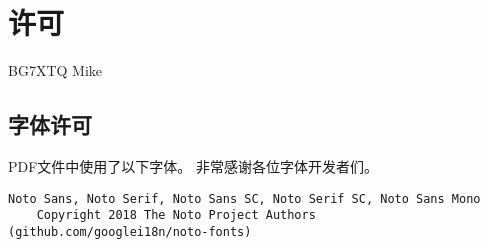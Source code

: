 \chapter*{许可}

\noindent {} BG7XTQ Mike

\section*{字体许可}

\noindent PDF文件中使用了以下字体。
非常感谢各位字体开发者们。

\begin{lstlisting}[numbers=none]
Noto Sans, Noto Serif, Noto Sans SC, Noto Serif SC, Noto Sans Mono
    Copyright 2018 The Noto Project Authors (github.com/googlei18n/noto-fonts)
\end{lstlisting}
